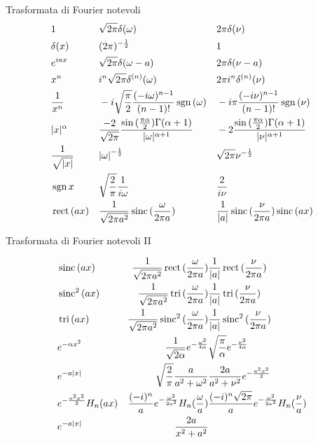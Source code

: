 \documentclass[asd-beamer.tex]{subfiles}%
\begin{document}
\begin{wordonframe}{Trasformata di Fourier notevoli}
\begin{align*}
& 1 & &\sqrt{2\pi}\delta(\omega) & &2\pi\delta(\nu)\\
& \delta(x) & &(2\pi)^{-\frac{1}{2}} & &1\\
& e^{iax} & &\sqrt{2\pi}\delta(\omega-a) & &2\pi\delta(\nu-a)\\
& x^n & &i^n\sqrt{2\pi}\delta^{(n)}(\omega) & &2\pi i^n\delta^{(n)}(\nu)\\
& \frac{1}{x^n} & &-i\sqrt{\frac{\pi}{2}}\frac{(-i\omega)^{n-1}}{(n-1)!}\operatorname{sgn}{(\omega)} & &-i\pi\frac{(-i\nu)^{n-1}}{(n-1)!}\operatorname{sgn}{(\nu)}\\
& |x|^{\alpha} & &\frac{-2}{\sqrt{2\pi}}\frac{\sin{(\frac{\pi\alpha}{2})}\Gamma(\alpha+1)}{|\omega|^{\alpha+1}} & &-2\frac{\sin{(\frac{\pi\alpha}{2})}\Gamma(\alpha+1)}{|\nu|^{\alpha+1}}\\
& \frac{1}{\sqrt{|x|}} & &{|\omega|}^{-\frac{1}{2}} & &\sqrt{2\pi}\nu^{-\frac{1}{2}}\\
& \operatorname{sgn}{x} & &\sqrt{\frac{2}{\pi}}\frac{1}{i\omega} & &\frac{2}{i\nu}\\
& \operatorname{rect}{(ax)} & &\frac{1}{\sqrt{2\pi a^2}}\operatorname{sinc}{(\frac{\omega}{2\pi a})} & &\frac{1}{|a|}\operatorname{sinc}{(\frac{\nu}{2\pi a})}\operatorname{sinc}{(ax)}\\
\end{align*}

\end{wordonframe}

\begin{wordonframe}{Trasformata di Fourier notevoli II}

\begin{align*}
&\operatorname{sinc}{(ax)} & \frac{1}{\sqrt{2\pi a^2}}\operatorname{rect}{(\frac{\omega}{2\pi a})} &  \frac{1}{|a|}\operatorname{rect}{(\frac{\nu}{2\pi a})}\\
&\operatorname{sinc}^2{(ax)} & \frac{1}{\sqrt{2\pi a^2}}\operatorname{tri}{(\frac{\omega}{2\pi a})} &  \frac{1}{|a|}\operatorname{tri}{(\frac{\nu}{2\pi a})}\\
&\operatorname{tri}{(ax)} & \frac{1}{\sqrt{2\pi a^2}}\operatorname{sinc}^2{(\frac{\omega}{2\pi a})} &  \frac{1}{|a|}\operatorname{sinc}^2{(\frac{\nu}{2\pi a})}\\
&e^{-\alpha x^2} & \frac{1}{\sqrt{2\alpha}}e^{-\frac{\omega^2}{4\alpha}} & \sqrt{\frac{\pi}{\alpha}}e^{-\frac{\nu^2}{4\alpha}}\\
&e^{-a|x|} & \sqrt{\frac{2}{\pi}}\frac{a}{a^2+\omega^2} & \frac{2a}{a^2+\nu^2}e^{-\frac{a^2x^2}{2}}\\
&e^{-\frac{a^2x^2}{2}}H_n(ax) & \frac{(-i)^n}{a}e^{-\frac{\omega^2}{2a^2}}H_n(\frac{\omega}{a}) & \frac{(-i)^n\sqrt{2\pi}}{a}e^{-\frac{\omega^2}{2a^2}}H_n(\frac{\nu}{a})\\
&e^{-a|x|} & \frac{2a}{x^2+a^2}
\end{align*}
\end{wordonframe}
\end{document}
